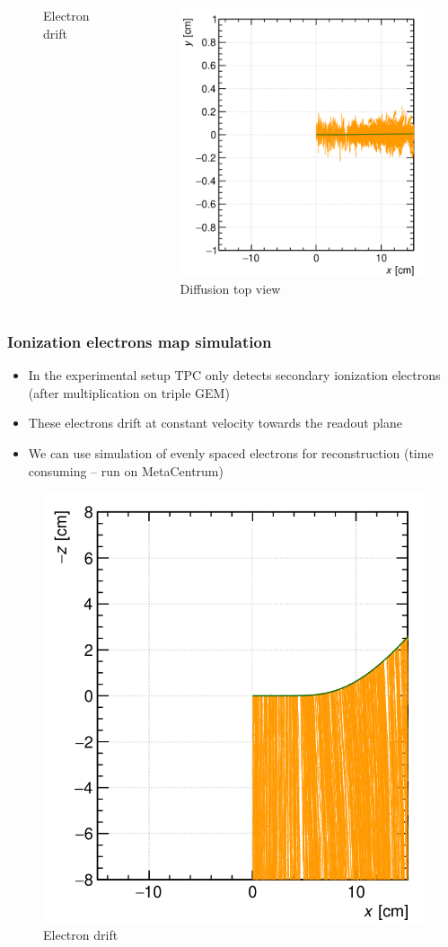 \documentclass{beamer}
\begin{document}
\begin{frame}
\begin{columns}
\begin{figure}
				\caption{Electron drift}
			\end{figure}
			\begin{figure}
				\centering
				\includegraphics[width = 0.95 \linewidth]{../images/track3.png}
				\caption{Diffusion top view}
			\end{figure}
		\end{columns}
	\end{frame}

	\begin{frame}
		\frametitle{Ionization electrons map simulation}
		\begin{itemize}
			\item In the experimental setup TPC only detects secondary ionization electrons (after multiplication on triple GEM)
			\item These electrons drift at constant velocity towards the readout plane
			\item We can use simulation of evenly spaced electrons for reconstruction (time consuming -- run on MetaCentrum)
		\end{itemize}
		\begin{figure}
			\centering
			\includegraphics[width = 0.3 \linewidth]{../images/track2.png}
			\caption{Electron drift}
		\end{figure}
	\end{frame}
\end{document}
